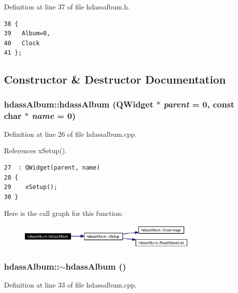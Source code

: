 Definition at line 37 of file hdassalbum.h.



\footnotesize\begin{verbatim}38 {
39   Album=0,
40   Clock     
41 };
\end{verbatim}\normalsize 


\subsection{Constructor \& Destructor Documentation}
\subsubsection{\setlength{\rightskip}{0pt plus 5cm}hdass\-Album::hdass\-Album ({\bf QWidget} $\ast$ {\em parent} = 0, const char $\ast$ {\em name} = 0)}\label{classhdassAlbum_hdassAlbuma0}




Definition at line 26 of file hdassalbum.cpp.

References x\-Setup().



\footnotesize\begin{verbatim}27  : QWidget(parent, name)
28 {
29    xSetup();
30 }
\end{verbatim}\normalsize 


Here is the call graph for this function:\begin{figure}[H]
\begin{center}
\leavevmode
\includegraphics[width=248pt]{classhdassAlbum_hdassAlbuma0_cgraph}
\end{center}
\end{figure}
\subsubsection{\setlength{\rightskip}{0pt plus 5cm}hdass\-Album::$\sim${\bf hdass\-Album} ()}\label{classhdassAlbum_hdassAlbuma1}




Definition at line 33 of file hdassalbum.cpp.



